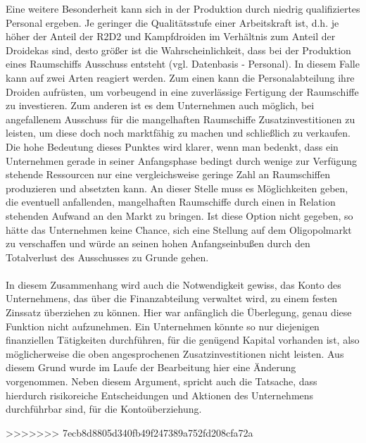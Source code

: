 Eine weitere Besonderheit kann sich in der Produktion durch niedrig qualifiziertes Personal ergeben. Je geringer die Qualitätsstufe einer Arbeitskraft ist, d.h. je höher der Anteil der R2D2 und Kampfdroiden im Verhältnis zum Anteil der Droidekas sind, desto größer ist die Wahrscheinlichkeit, dass bei der Produktion eines Raumschiffs Ausschuss entsteht (vgl. Datenbasis - Personal). In diesem Falle kann auf zwei Arten reagiert werden. Zum einen kann die Personalabteilung ihre Droiden aufrüsten, um vorbeugend in eine zuverlässige Fertigung der Raumschiffe zu investieren. Zum anderen ist es dem Unternehmen auch möglich, bei angefallenem Ausschuss für die mangelhaften Raumschiffe Zusatzinvestitionen zu leisten, um diese doch noch marktfähig zu machen und schließlich zu verkaufen. Die hohe Bedeutung dieses Punktes wird klarer, wenn man bedenkt, dass ein Unternehmen gerade in seiner Anfangsphase bedingt durch wenige zur Verfügung stehende Ressourcen nur eine vergleichsweise geringe Zahl an Raumschiffen produzieren und absetzten kann. An dieser Stelle muss es Möglichkeiten geben, die eventuell anfallenden, mangelhaften Raumschiffe durch einen in Relation stehenden Aufwand an den Markt zu bringen. Ist diese Option nicht gegeben, so hätte das Unternehmen keine Chance, sich eine Stellung auf dem Oligopolmarkt zu verschaffen und würde an seinen hohen Anfangseinbußen durch den Totalverlust des Ausschusses zu Grunde gehen. 
\\
\\
In diesem Zusammenhang wird auch die Notwendigkeit gewiss, das Konto des Unternehmens, das über die Finanzabteilung verwaltet wird, zu einem festen Zinssatz überziehen zu können. Hier war anfänglich die Überlegung, genau diese Funktion nicht aufzunehmen. Ein Unternehmen könnte so nur diejenigen finanziellen Tätigkeiten durchführen, für die genügend Kapital vorhanden ist, also möglicherweise die oben angesprochenen Zusatzinvestitionen nicht leisten. Aus diesem Grund wurde im Laufe der Bearbeitung hier eine Änderung vorgenommen.  Neben diesem Argument, spricht auch die Tatsache, dass hierdurch risikoreiche Entscheidungen und Aktionen des Unternehmens durchführbar sind, für die Kontoüberziehung.

\autorende{}

>>>>>>> 7ecb8d8805d340fb49f247389a752fd208cfa72a
